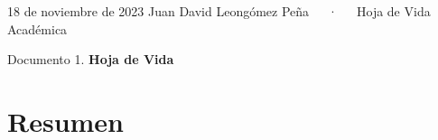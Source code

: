 \documentclass[11pt,a4paper,]{awesome-cv}
\begin{document}
\makecvheader

\makecvfooter
  {18 de noviembre de 2023}
    {Juan David Leongómez Peña~~~·~~~Hoja de Vida Académica}
  {\thepage}





\vspace{4mm}
\begin{tcolorbox}[enhanced,
        on line, 
        boxsep=4pt, left=0pt,right=0pt,top=0pt,bottom=0pt,
        colframe=white,colback=black]
  
\color{white}
\begin{LARGE}\begin{center}
Documento 1. \textbf{Hoja de Vida}
\end{center}\end{LARGE}
\end{tcolorbox}

\hypertarget{resumen}{%
\section{Resumen}\label{resumen}}
\end{document}
